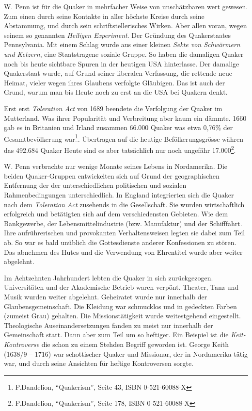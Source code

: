 \medskip

W. Penn ist für die Quaker in mehrfacher Weise von unschätzbaren wert gewesen.
Zum einen durch seine Kontakte in aller höchste Kreise durch seine Abstammung,
und
durch sein schriftstellerisches Wirken. Aber allen voran, wegen seinem so
genannten \textit{Heiligen Experiment}. Der Gründung des Quakerstaates
Pennsylvania. Mit einem Schlag wurde aus einer kleinen \textit{Sekte von
Schwärmern und Ketzern}, eine Staatstragene soziale Gruppe. So haben die
damaligen Quaker noch bis heute sichtbare Spuren in der heutigen USA
hinterlasse.
Der damalige Quakerstaat wurde, auf Grund seiner liberalen Verfassung, die
rettende neue Heimat, vieler wegen ihres Glaubens verfolgte Gläubigen. Das ist
auch der Grund, warum man bis Heute noch zu erst an die USA bei Quakern denkt.

\medskip

Erst erst \textit{Toleration Act} von 1689 beendete die Verfolgung der Quaker im
Mutterland. Was ihrer Popularität und Verbreitung aber kaum ein dämmte. 1660 gab
es in Britanien und Irland zusammen 66.000 Quaker was etwa 0,76\% der
Gesamtbevölkerung war\footnote{P.Dandelion, "`Quakerism"', Seite 43, ISBN
0-521-60088-X}. Übertragen auf die heutige Befölkerungsgrösse währen das 492.684
Quaker Heute sind es aber tatsächlich nur noch ungefähr
17.000\footnote{P.Dandelion, "`Quakerism"', Seite 178, ISBN 0-521-60088-X}.

\medskip

W. Penn verbrachte nur wenige Monate seines Lebens in Nordamerika. Die beiden
Quaker-Gruppen entwickelten sich auf Grund der geographischen Entfernung der der
unterschiedlichen politischen und sozialen Rahmenbedingungen unterschiedlich. In
England integrierten sich die Quaker nach dem \textit{Toleration Act} zusehends
in die Gesellschaft. Sie wurden wirtschaftlich erfolgreich und betätigten sich
auf dem verschiedensten Gebieten. Wie dem Bankgewerbe, der Lebensmittelindustrie
(bzw. Manufaktur) und der Schifffahrt. Ihre aufrührerischen und provokanten
Verhaltensweisen legten sie dabei zum Teil ab. So war es bald unüblich die
Gottesdienste anderer Konfessionen zu stören. Das abnehmen des Hutes und die
Verwendung von Ehrentitel wurde aber weiter abgelehnt.

\medskip

Im Achtzehnten Jahrhundert lebten die Quaker in sich zurückgezogen.
Universitäten und der Akademische Betrieb waren verpönt. Theater, Tanz und Musik
wurden weiter abgelehnt. Geheiratet wurde nur innerhalb der
Glaubensgemeinschaft. Die Kleidung war schmucklos und in gedeckten Farben
(zumeist Grau) gehalten. Die Missionstätigkeit wurde weitestgehend eingestellt.
Theologische Auseinandersetzungen fanden zu meist nur innerhalb der Gemeinschaft
statt. Dann aber zum Teil um so heftiger. Ein Beispiel ist die
\textit{Keit-Kontroverse} die schon zu einem Stehden Begriff geworden ist.
George Keith (1638/9 -- 1716) war schottischer Quaker und Missionar, der in
Nordamerika tätig war, und durch seine Ansichten für heftige Kontroversen
sorgte.

